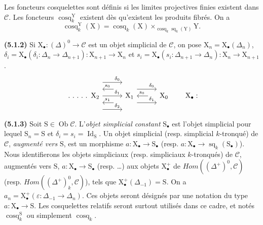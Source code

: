\documentclass[11pt,leqno]{article}
\begin{document}
Les foncteurs cosquelettes sont définis si les limites projectives finies existent dans \(\mathscr{C}\). Les foncteurs \(\operatorname{cosq}_k^{\mathrm{Y}}\) existent dès qu’existent les produits fibrés. On a
\[
\operatorname{cosq}_k^{\mathrm{Y}}(\mathrm{X})
=\operatorname{cosq}_k(\mathrm{X})
\times_{\operatorname{cosq}_k\operatorname{sq}_k(\mathrm{Y})}\mathrm{Y}.
\]

\textbf{(5.1.2)} Si \(\mathrm{X}_{\bullet}:(\Delta)^0\to\mathscr{C}\) est un objet simplicial de \(\mathscr{C}\), on pose \(\mathrm{X}_n=\mathrm{X}_{\bullet}(\Delta_n)\), \(\delta_i=\mathrm{X}_{\bullet}(\delta_i:\Delta_n\to\Delta_{n+1}):\mathrm{X}_{n+1}\to\mathrm{X}_n\) et \(s_i=\mathrm{X}_{\bullet}(s_i:\Delta_{n+1}\to\Delta_n):\mathrm{X}_n\to\mathrm{X}_{n+1}\).
\[
\begin{tikzcd}[column sep=2.8em]
\ldotp\,\ldotp\,\ldotp\,\ldotp\,\ldotp\ \mathrm{X}_2
  \arrow[r, shift left=4.4ex, "\delta_0"{near end}]
  \arrow[r, "\delta_1"{near end}]
  \arrow[r, shift right=4.4ex, "\delta_2"{near end}]
&
\mathrm{X}_1
  \arrow[l, shift right=2.2ex, shorten <=1.2em, "s_0"'{near end}]
  \arrow[l, shift left=2.2ex, shorten <=1.2em, "s_1"'{near end}]
  \arrow[r, shift left=2.2ex, "\delta_0"{near end}]
  \arrow[r, shift right=2.2ex, "\delta_1"{near end}]
&
\mathrm{X}_0
  \arrow[l, shorten <=1.2em, "s_0"'{near end}]
\end{tikzcd}
\tag*{\(\mathrm{X}_{\bullet}:\)}
\]

\textbf{(5.1.3)} Soit \(\mathrm{S}\in\operatorname{Ob}\mathscr{C}\). L’\textit{objet simplicial constant} \(\mathrm{S}_{\bullet}\) est l’objet simplicial pour lequel \(\mathrm{S}_n=\mathrm{S}\) et \(\delta_i=s_i=\operatorname{Id}_{\mathrm{S}}\). Un objet simplicial (resp. simplicial \(k\)-tronqué) de \(\mathscr{C}\), \textit{augmenté vers} \(\mathrm{S}\), est un morphisme \(a:\mathrm{X}_{\bullet}\to\mathrm{S}_{\bullet}\) (resp. \(a:\mathrm{X}_{\bullet}\to\operatorname{sq}_k(\mathrm{S}_{\bullet})\)). Nous identifierons les objets simpliciaux (resp. simpliciaux \(k\)-tronqués) de \(\mathscr{C}\), augmentés vers \(\mathrm{S}\), \(a:\mathrm{X}_{\bullet}\to\mathrm{S}_{\bullet}\) (resp. …) aux objets \(\mathrm{X}_{\bullet}^{+}\) de \(\mathit{Hom}((\Delta^+)^0,\mathscr{C})\) (resp. \(\mathit{Hom}((\Delta^+)_k^0,\mathscr{C})\)), tels que \(\mathrm{X}_{\bullet}^{+}(\Delta_{-1})=\mathrm{S}\). On a \(a_n=\mathrm{X}_{\bullet}^{+}(\varepsilon:\Delta_{-1}\to\Delta_n)\). Ces objets seront désignés par une notation du type \(a:\mathrm{X}_{\bullet}\to\mathrm{S}\). Les cosquelettes relatifs seront surtout utilisés dans ce cadre, et notés \(\operatorname{cosq}_k^{\mathrm{S}}\) ou simplement \(\operatorname{cosq}_k\).
\end{document}
